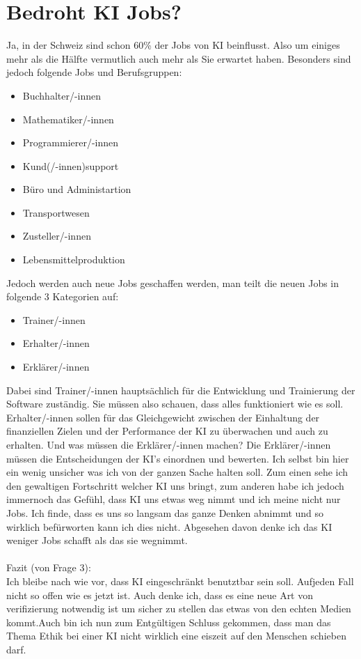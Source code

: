 \section{Bedroht KI Jobs?}
Ja, in der Schweiz sind schon 60\% der Jobs von KI beinflusst. Also um einiges mehr als die Hälfte vermutlich auch mehr als Sie erwartet haben. Besonders sind jedoch folgende Jobs und Berufsgruppen:
\begin{itemize}
    \item Buchhalter/-innen
    \item Mathematiker/-innen
    \item Programmierer/-innen
    \item Kund(/-innen)support
    \item Büro und Administartion
    \item Transportwesen
    \item Zusteller/-innen
    \item Lebensmittelproduktion
\end{itemize}
Jedoch werden auch neue Jobs geschaffen werden, man teilt die neuen Jobs in folgende 3 Kategorien auf:
\begin{itemize}
    \item Trainer/-innen
    \item Erhalter/-innen
    \item Erklärer/-innen
\end{itemize}
Dabei sind Trainer/-innen hauptsächlich für die Entwicklung und Trainierung der Software zuständig. Sie müssen also schauen, dass alles funktioniert wie es soll.
Erhalter/-innen sollen für das Gleichgewicht zwischen der Einhaltung der finanziellen Zielen und der Performance der KI zu überwachen und auch zu erhalten.
Und was müssen die Erklärer/-innen machen? Die Erklärer/-innen müssen die Entscheidungen der KI's einordnen und bewerten.\citep{bedrohte-jobs-kununu}
Ich selbst bin hier ein wenig unsicher was ich von der ganzen Sache halten soll. Zum einen sehe ich den  gewaltigen Fortschritt welcher KI uns bringt, zum anderen habe ich jedoch immernoch das Gefühl,
dass KI uns etwas weg nimmt und ich meine nicht nur Jobs. Ich finde, dass es uns so langsam das ganze Denken abnimmt und so wirklich befürworten kann ich dies nicht. Abgesehen davon denke ich das KI weniger Jobs schafft als das sie wegnimmt.
\\
\\{\large Fazit (von Frage 3):}
\\
Ich bleibe nach wie vor, dass KI eingeschränkt benutztbar sein soll. Aufjeden Fall nicht so offen wie es jetzt ist. Auch denke ich, dass es eine neue Art von verifizierung notwendig ist um sicher zu stellen das etwas von den echten Medien kommt.Auch bin ich nun zum Entgültigen Schluss gekommen, dass man das Thema Ethik bei einer KI nicht wirklich eine eiszeit auf den Menschen schieben darf.

